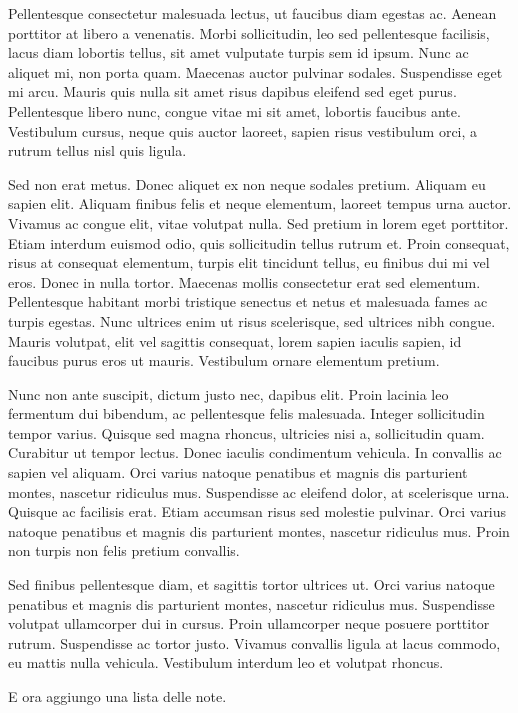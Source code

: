 Pellentesque consectetur malesuada lectus, ut faucibus diam egestas ac. Aenean porttitor at libero a venenatis. Morbi sollicitudin, leo sed pellentesque facilisis, lacus diam lobortis tellus, sit amet vulputate turpis sem id ipsum. Nunc ac aliquet mi, non porta quam. Maecenas auctor pulvinar sodales. Suspendisse eget mi arcu. Mauris quis nulla sit amet risus dapibus eleifend sed eget purus. Pellentesque libero nunc, congue vitae mi sit amet, lobortis faucibus ante. Vestibulum cursus, neque quis auctor laoreet, sapien risus vestibulum orci, a rutrum tellus nisl quis ligula.

Sed non erat metus. Donec aliquet ex non neque sodales pretium. Aliquam eu sapien elit. Aliquam finibus felis et neque elementum, laoreet tempus urna auctor. Vivamus ac congue elit, vitae volutpat nulla. Sed pretium in lorem eget porttitor. Etiam interdum euismod odio, quis sollicitudin tellus rutrum et. Proin consequat, risus at consequat elementum, turpis elit tincidunt tellus, eu finibus dui mi vel eros. Donec in nulla tortor. Maecenas mollis consectetur erat sed elementum. Pellentesque habitant morbi tristique senectus et netus et malesuada fames ac turpis egestas. Nunc ultrices enim ut risus scelerisque, sed ultrices nibh congue. Mauris volutpat, elit vel sagittis consequat, lorem sapien iaculis sapien, id faucibus purus eros ut mauris. Vestibulum ornare elementum pretium.

Nunc non ante suscipit, dictum justo nec, dapibus elit. Proin lacinia leo fermentum dui bibendum, ac pellentesque felis malesuada. Integer sollicitudin tempor varius. Quisque sed magna rhoncus, ultricies nisi a, sollicitudin quam. Curabitur ut tempor lectus. Donec iaculis condimentum vehicula. In convallis ac sapien vel aliquam. Orci varius natoque penatibus et magnis dis parturient montes, nascetur ridiculus mus. Suspendisse ac eleifend dolor, at scelerisque urna. Quisque ac facilisis erat. Etiam accumsan risus sed molestie pulvinar. Orci varius natoque penatibus et magnis dis parturient montes, nascetur ridiculus mus. Proin non turpis non felis pretium convallis.

Sed finibus pellentesque diam, et sagittis tortor ultrices ut. Orci varius natoque penatibus et magnis dis parturient montes, nascetur ridiculus mus. Suspendisse volutpat ullamcorper dui in cursus. Proin ullamcorper neque posuere porttitor rutrum. Suspendisse ac tortor justo. Vivamus convallis ligula at lacus commodo, eu mattis nulla vehicula. Vestibulum interdum leo et volutpat rhoncus.

E ora aggiungo una lista delle note.
